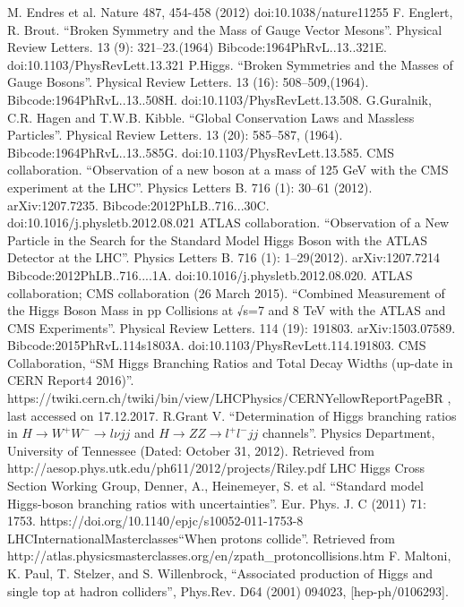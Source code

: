 \documentclass[print]{nuthesis}
\begin{document}
\begin{thebibliography}{200}
 M. Endres et al. Nature 487, 454-458 (2012) doi:10.1038/nature11255
 F. Englert, R. Brout. ``Broken Symmetry and the Mass of Gauge Vector Mesons''. Physical Review Letters. 13 (9): 321–23.(1964) Bibcode:1964PhRvL..13..321E. doi:10.1103/PhysRevLett.13.321
 P.Higgs. ``Broken Symmetries and the Masses of Gauge Bosons''. Physical Review Letters. 13 (16): 508–509,(1964). Bibcode:1964PhRvL..13..508H. doi:10.1103/PhysRevLett.13.508.
 G.Guralnik, C.R. Hagen  and T.W.B. Kibble. ``Global Conservation Laws and Massless Particles''. Physical Review Letters. 13 (20): 585–587, (1964). Bibcode:1964PhRvL..13..585G. doi:10.1103/PhysRevLett.13.585.
CMS collaboration. ``Observation of a new boson at a mass of 125 GeV with the CMS experiment at the LHC''. Physics Letters B. 716 (1): 30–61 (2012). arXiv:1207.7235. Bibcode:2012PhLB..716...30C. doi:10.1016/j.physletb.2012.08.021
  ATLAS collaboration. ``Observation of a New Particle in the Search for the Standard Model Higgs Boson with the ATLAS Detector at the LHC''. Physics Letters B. 716 (1): 1–29(2012). arXiv:1207.7214 Bibcode:2012PhLB..716....1A. doi:10.1016/j.physletb.2012.08.020.
 ATLAS collaboration; CMS collaboration (26 March 2015). ``Combined Measurement of the Higgs Boson Mass in pp Collisions at √s=7 and 8 TeV with the ATLAS and CMS Experiments''. Physical Review Letters. 114 (19): 191803. arXiv:1503.07589. Bibcode:2015PhRvL.114s1803A. doi:10.1103/PhysRevLett.114.191803.
 CMS Collaboration, ``SM Higgs Branching Ratios and Total Decay Widths (up-date in CERN Report4 2016)''. https://twiki.cern.ch/twiki/bin/view/LHCPhysics/CERNYellowReportPageBR , last accessed on 17.12.2017.
 R.Grant V. ``Determination of Higgs branching ratios in $H\to W^+W^−\to lνjj$ and $H\to ZZ \to l^+l^-jj$ channels''. Physics Department, University of Tennessee (Dated: October 31, 2012). Retrieved from http://aesop.phys.utk.edu/ph611/2012/projects/Riley.pdf
LHC Higgs Cross Section Working Group, Denner, A., Heinemeyer, S. et al. ``Standard model Higgs-boson branching ratios with uncertainties''. Eur. Phys. J. C (2011) 71: 1753. https://doi.org/10.1140/epjc/s10052-011-1753-8
 LHC\@ InternationalMasterclasses``When protons collide''. Retrieved from http://atlas.physicsmasterclasses.org/en/zpath\_protoncollisions.htm
 F. Maltoni, K. Paul, T. Stelzer, and S. Willenbrock, ``Associated production of Higgs and single top at hadron colliders'', Phys.Rev. D64 (2001) 094023, [hep-ph/0106293].

\end{thebibliography}
\end{document}
